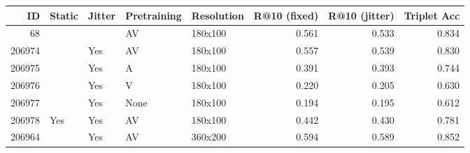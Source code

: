 \begin{tabular}{rllllrrr}
\toprule
    ID & Static & Jitter & Pretraining & Resolution &  R@10 (fixed) &  R@10 (jitter) &  Triplet Acc \\
\midrule
    68 &        &        &          AV &    180x100 &         0.561 &          0.533 &        0.834 \\
206974 &        &    Yes &          AV &    180x100 &         0.557 &          0.539 &        0.830 \\
206975 &        &    Yes &           A &    180x100 &         0.391 &          0.393 &        0.744 \\
206976 &        &    Yes &           V &    180x100 &         0.220 &          0.205 &        0.630 \\
206977 &        &    Yes &        None &    180x100 &         0.194 &          0.195 &        0.612 \\
206978 &    Yes &    Yes &          AV &    180x100 &         0.442 &          0.430 &        0.781 \\
206964 &        &    Yes &          AV &    360x200 &         0.594 &          0.589 &        0.852 \\
\bottomrule
\end{tabular}
